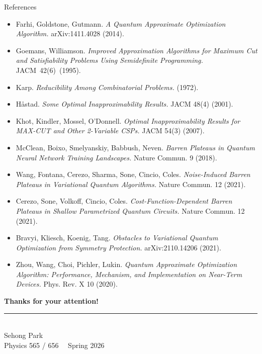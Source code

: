 \documentclass[aspectratio=169,11pt]{beamer}
\begin{document}
\begin{frame}[allowframebreaks]{References}
  \footnotesize
  \begin{itemize}
    \item Farhi, Goldstone, Gutmann.
          \emph{A Quantum Approximate Optimization Algorithm.}
          arXiv:1411.4028 (2014).
    \item Goemans, Williamson.
          \emph{Improved Approximation Algorithms for Maximum Cut and
          Satisfiability Problems Using Semidefinite Programming.}
          \mbox{JACM 42(6) (1995)}.
    \item Karp.
          \emph{Reducibility Among Combinatorial Problems.} (1972).
    \item H{\aa}stad.
          \emph{Some Optimal Inapproximability Results.}
          JACM 48(4) (2001).
    \item Khot, Kindler, Mossel, O'Donnell.
          \emph{Optimal Inapproximability Results for MAX-CUT and Other
          2-Variable CSPs.} JACM 54(3) (2007).
    \item McClean, Boixo, Smelyanskiy, Babbush, Neven.
          \emph{Barren Plateaus in Quantum Neural Network Training Landscapes.}
          Nature Commun. 9 (2018).
    \item Wang, Fontana, Cerezo, Sharma, Sone, Cincio, Coles.
          \emph{Noise-Induced Barren Plateaus in Variational Quantum Algorithms.}
          Nature Commun. 12 (2021).
    \item Cerezo, Sone, Volkoff, Cincio, Coles.
          \emph{Cost-Function-Dependent Barren Plateaus in Shallow
          Parametrized Quantum Circuits.}
          Nature Commun. 12 (2021).
    \item Bravyi, Kliesch, Koenig, Tang.
          \emph{Obstacles to Variational Quantum Optimization from
          Symmetry Protection.}
          arXiv:2110.14206 (2021).
    \item Zhou, Wang, Choi, Pichler, Lukin.
          \emph{Quantum Approximate Optimization Algorithm: Performance,
          Mechanism, and Implementation on Near-Term Devices.}
          Phys. Rev. X 10 (2020).
  \end{itemize}
\end{frame}

\begin{frame}[plain]
  \centering
  \vfill
  {\Huge\bfseries\color{NavyDeep} Thanks for your attention!}\\[1em]
  {\color{Mustard}\rule{6em}{1.5pt}}\\[1em]
  {\large Sehong Park}\\[2pt]
  {\small Physics 565 / 656 \ \textperiodcentered\  Spring 2026}
  \vfill
\end{frame}
\end{document}
